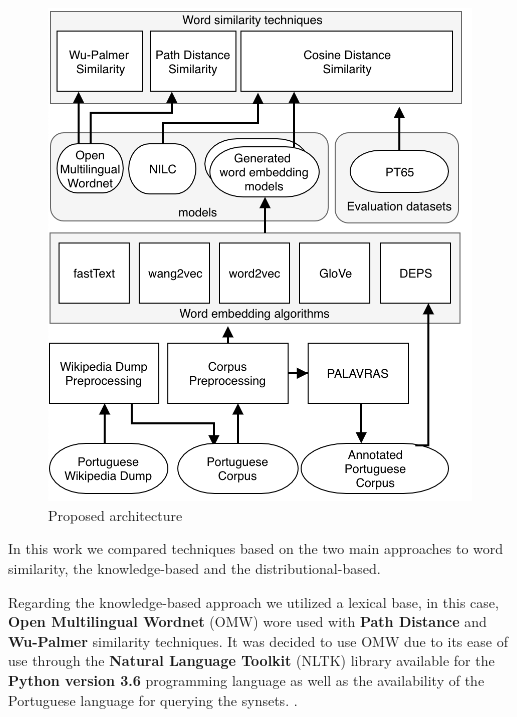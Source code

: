 \begin{figure}[h]
	\caption{Proposed architecture}
	\label{fig:arq}
	\centering%
	\begin{minipage}{.8\textwidth}
		\includegraphics[width=\textwidth]{arq.png}
	\end{minipage}
\end{figure}


In this work we compared techniques based on the two main approaches to word similarity, the knowledge-based and the distributional-based. 

Regarding the knowledge-based approach we utilized a lexical base, in this case, \textbf{Open Multilingual Wordnet} (OMW) wore used with \textbf{Path Distance} and \textbf{Wu-Palmer} similarity techniques. It was decided to use OMW due to its ease of use through the \textbf{Natural Language Toolkit} (NLTK) library available for the \textbf{Python version 3.6} programming language as well as the availability of the Portuguese language for querying the synsets. \cite{Bond2013LinkingAE}.

